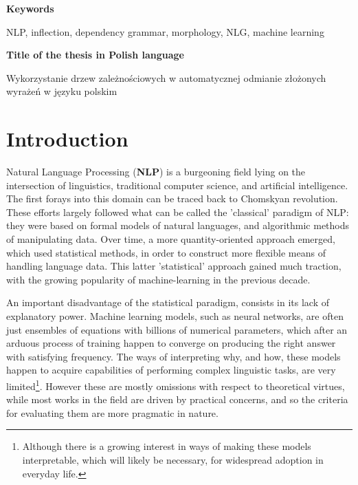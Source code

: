 \documentclass[12pt]{article}
\begin{document}
\vspace{\baselineskip}
\begin{center}
\textbf{Keywords}
\end{center}
NLP, inflection, dependency grammar, morphology, NLG, machine learning

\vspace{5\baselineskip}
\begin{center}
\textbf{Title of the thesis in Polish language}
\end{center}
Wykorzystanie drzew zależnościowych w automatycznej odmianie złożonych wyrażeń w języku polskim
\pagebreak
\tableofcontents

\section{Introduction}
\label{introduction}
Natural Language Processing (\textbf{NLP}) is a burgeoning field lying on the intersection of linguistics, traditional computer science, and artificial intelligence. The first forays into this domain can be traced back to Chomskyan revolution. These efforts largely followed what can be called the 'classical' paradigm of NLP: they were based on formal models of natural languages, and algorithmic methods of manipulating data. Over time, a more quantity-oriented approach emerged, which used statistical methods, in order to construct more flexible means of handling language data. This latter 'statistical' approach gained much traction, with the growing popularity of machine-learning in the previous decade. 

An important disadvantage of the statistical paradigm, consists in its lack of explanatory power. Machine learning models, such as neural networks, are often just ensembles of equations with billions of numerical parameters, which after an arduous process of training happen to converge on producing the right answer with satisfying frequency. The ways of interpreting why, and how, these models happen to acquire capabilities of performing complex linguistic tasks, are very limited\footnote{Although there is a growing interest in ways of making these models interpretable, which will likely be necessary, for widespread adoption in everyday life.}. However these are mostly omissions with respect to theoretical virtues, while most works in the field are driven by practical concerns, and so the criteria for evaluating them are more pragmatic in nature.
\end{document}
